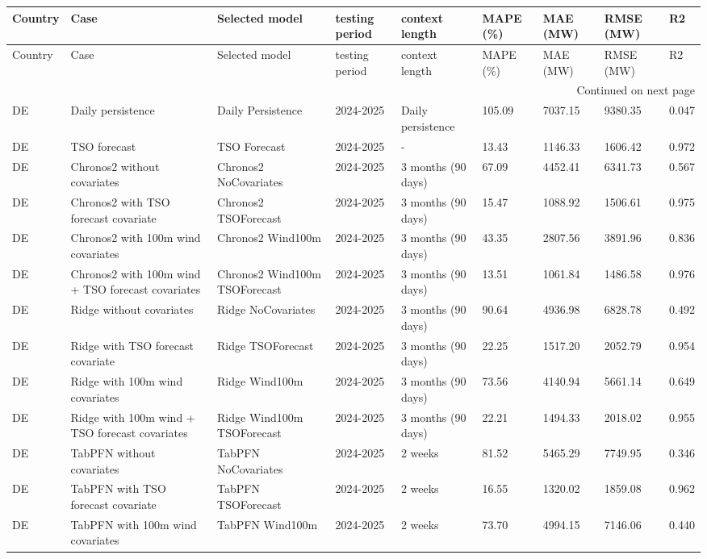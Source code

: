 \begin{longtable}{lllllllll}
\toprule
Country & Case & Selected model & testing period & context length & MAPE (\%) & MAE (MW) & RMSE (MW) & R2 \\
\midrule
\endfirsthead
\toprule
Country & Case & Selected model & testing period & context length & MAPE (\%) & MAE (MW) & RMSE (MW) & R2 \\
\midrule
\endhead
\midrule
\multicolumn{9}{r}{Continued on next page} \\
\midrule
\endfoot
\bottomrule
\endlastfoot
DE & Daily persistence & Daily Persistence & 2024-2025 & Daily persistence & 105.09 & 7037.15 & 9380.35 & 0.047 \\
DE & TSO forecast & TSO Forecast & 2024-2025 & - & 13.43 & 1146.33 & 1606.42 & 0.972 \\
DE & Chronos2 without covariates & Chronos2 NoCovariates & 2024-2025 & 3 months (90 days) & 67.09 & 4452.41 & 6341.73 & 0.567 \\
DE & Chronos2 with TSO forecast covariate & Chronos2 TSOForecast & 2024-2025 & 3 months (90 days) & 15.47 & 1088.92 & 1506.61 & 0.975 \\
DE & Chronos2 with 100m wind covariates & Chronos2 Wind100m & 2024-2025 & 3 months (90 days) & 43.35 & 2807.56 & 3891.96 & 0.836 \\
DE & Chronos2 with 100m wind + TSO forecast covariates & Chronos2 Wind100m TSOForecast & 2024-2025 & 3 months (90 days) & 13.51 & 1061.84 & 1486.58 & 0.976 \\
DE & Ridge without covariates & Ridge NoCovariates & 2024-2025 & 3 months (90 days) & 90.64 & 4936.98 & 6828.78 & 0.492 \\
DE & Ridge with TSO forecast covariate & Ridge TSOForecast & 2024-2025 & 3 months (90 days) & 22.25 & 1517.20 & 2052.79 & 0.954 \\
DE & Ridge with 100m wind covariates & Ridge Wind100m & 2024-2025 & 3 months (90 days) & 73.56 & 4140.94 & 5661.14 & 0.649 \\
DE & Ridge with 100m wind + TSO forecast covariates & Ridge Wind100m TSOForecast & 2024-2025 & 3 months (90 days) & 22.21 & 1494.33 & 2018.02 & 0.955 \\
DE & TabPFN without covariates & TabPFN NoCovariates & 2024-2025 & 2 weeks & 81.52 & 5465.29 & 7749.95 & 0.346 \\
DE & TabPFN with TSO forecast covariate & TabPFN TSOForecast & 2024-2025 & 2 weeks & 16.55 & 1320.02 & 1859.08 & 0.962 \\
DE & TabPFN with 100m wind covariates & TabPFN Wind100m & 2024-2025 & 2 weeks & 73.70 & 4994.15 & 7146.06 & 0.440 \\

\end{longtable}
